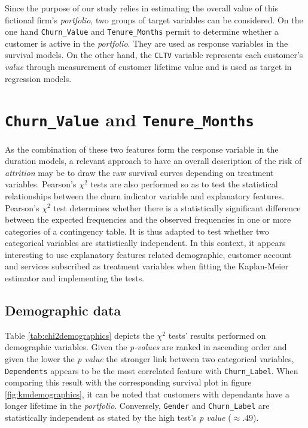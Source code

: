\documentclass[
]{book}
\begin{document}
Since the purpose of our study relies in estimating the overall value of this fictional firm's \emph{portfolio}, two groups of target variables can be considered. On the one hand \texttt{Churn\_Value} and \texttt{Tenure\_Months} permit to determine whether a customer is active in the \emph{portfolio}. They are used as response variables in the survival models. On the other hand, the \texttt{CLTV} variable represents each customer's \emph{value} through measurement of customer lifetime value and is used as target in regression models.

\hypertarget{churn_value-and-tenure_months}{%
\section{\texorpdfstring{\texttt{Churn\_Value} and \texttt{Tenure\_Months}}{Churn\_Value and Tenure\_Months}}\label{churn_value-and-tenure_months}}

As the combination of these two features form the response variable in the duration models, a relevant approach to have an overall description of the risk of \emph{attrition} may be to draw the raw survival curves depending on treatment variables. Pearson's \(\chi^2\) tests are also performed so as to test the statistical relationships between the churn indicator variable and explanatory features. Pearson's \(\chi^2\) test determines whether there is a statistically significant difference between the expected frequencies and the observed frequencies in one or more categories of a contingency table. It is thus adapted to test whether two categorical variables are statistically independent. In this context, it appears interesting to use explanatory features related demographic, customer account and services subscribed as treatment variables when fitting the Kaplan-Meier estimator and implementing the tests.

\hypertarget{demographic-data}{%
\subsection*{Demographic data}\label{demographic-data}}

Table \ref{tab:chi2demographics} depicts the \(\chi^2\) tests' results performed on demographic variables. Given the \emph{p-values} are ranked in ascending order and given the lower the \emph{p value} the stronger link between two categorical variables, \texttt{Dependents} appears to be the most correlated feature with \texttt{Churn\_Label}. When comparing this result with the corresponding survival plot in figure \ref{fig:kmdemographics}, it can be noted that customers with dependants have a longer lifetime in the \emph{portfolio}. Conversely, \texttt{Gender} and \texttt{Churn\_Label} are statistically independent as stated by the high test's \emph{p value} (\(\approx .49\)).
\end{document}

